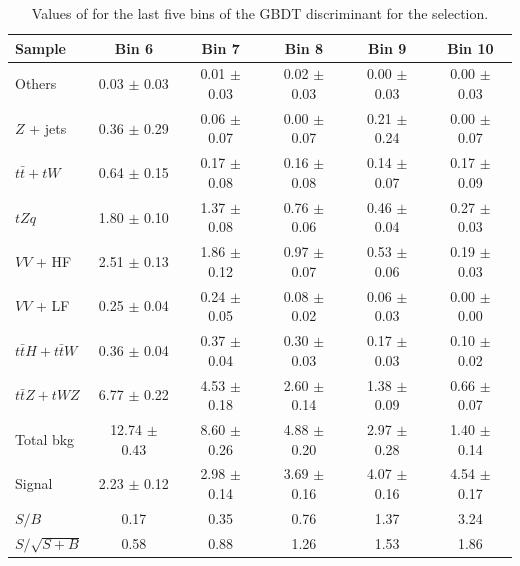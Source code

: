 \begin{table}[!h]
	\centering
	\small
	\begin{tabular}{|l|c|c|c|c|c|} 
		\hline 
		Sample 			       & Bin 6            & Bin 7           & Bin 8           & Bin 9           & Bin 10          \\ 
		\hline                 
		Others 			       & 0.03  $\pm$ 0.03 & 0.01 $\pm$ 0.03 & 0.02 $\pm$ 0.03 & 0.00 $\pm$ 0.03 & 0.00 $\pm$ 0.03 \\
		$Z$ + jets             & 0.36  $\pm$ 0.29 & 0.06 $\pm$ 0.07 & 0.00 $\pm$ 0.07 & 0.21 $\pm$ 0.24 & 0.00 $\pm$ 0.07 \\
		$t\bar{t}+tW$          & 0.64  $\pm$ 0.15 & 0.17 $\pm$ 0.08 & 0.16 $\pm$ 0.08 & 0.14 $\pm$ 0.07 & 0.17 $\pm$ 0.09 \\
		$tZq$ 			       & 1.80  $\pm$ 0.10 & 1.37 $\pm$ 0.08 & 0.76 $\pm$ 0.06 & 0.46 $\pm$ 0.04 & 0.27 $\pm$ 0.03 \\
		$VV$ + HF              & 2.51  $\pm$ 0.13 & 1.86 $\pm$ 0.12 & 0.97 $\pm$ 0.07 & 0.53 $\pm$ 0.06 & 0.19 $\pm$ 0.03 \\
		$VV$ + LF              & 0.25  $\pm$ 0.04 & 0.24 $\pm$ 0.05 & 0.08 $\pm$ 0.02 & 0.06 $\pm$ 0.03 & 0.00 $\pm$ 0.00 \\
		$t\bar{t}H+t\bar{t}W$  & 0.36  $\pm$ 0.04 & 0.37 $\pm$ 0.04 & 0.30 $\pm$ 0.03 & 0.17 $\pm$ 0.03 & 0.10 $\pm$ 0.02 \\
		$t\bar{t}Z+tWZ$        & 6.77  $\pm$ 0.22 & 4.53 $\pm$ 0.18 & 2.60 $\pm$ 0.14 & 1.38 $\pm$ 0.09 & 0.66 $\pm$ 0.07 \\
		\hline                                                                                                           
		Total bkg              & 12.74 $\pm$ 0.43 & 8.60 $\pm$ 0.26 & 4.88 $\pm$ 0.20 & 2.97 $\pm$ 0.28 & 1.40 $\pm$ 0.14 \\
		\hline                                                                                                           
		Signal                 & 2.23  $\pm$ 0.12 & 2.98 $\pm$ 0.14 & 3.69 $\pm$ 0.16 & 4.07 $\pm$ 0.16 & 4.54 $\pm$ 0.17 \\
		\hline                 
		$S/B$                  & 0.17             & 0.35            & 0.76            & 1.37            & 3.24            \\
		$S/\sqrt{S+B}$         & 0.58             & 0.88            & 1.26            & 1.53            & 1.86       \\
		\hline
	\end{tabular} 
	\caption{Values of \ssplusb for the last five bins of the GBDT discriminant for the \DLrc selection.}%
	\label{tab:yields:sr3_dl1rc_bdt}
\end{table}


